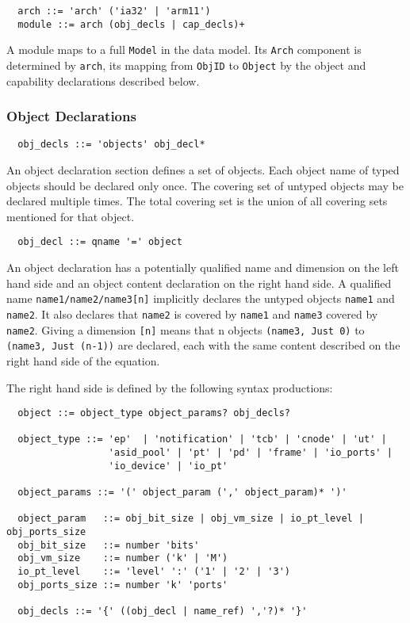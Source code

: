 \documentclass[a4paper,12pt]{article}
\begin{document}
\begin{verbatim}
  arch ::= 'arch' ('ia32' | 'arm11') 
  module ::= arch (obj_decls | cap_decls)+ 
\end{verbatim}

A module maps to a full \texttt{Model} in the data model. Its \texttt{Arch} component is determined by \texttt{arch}, its mapping from \texttt{ObjID} to \texttt{Object} by the object and capability declarations described below.


\subsubsection{Object Declarations}

\begin{verbatim}
  obj_decls ::= 'objects' obj_decl*
\end{verbatim}

An object declaration section defines a set of objects. Each object name of typed objects should be declared only once. The covering set of untyped objects may be declared multiple times. The total covering set is the union of all covering sets mentioned for that object.

\begin{verbatim}
  obj_decl ::= qname '=' object
\end{verbatim}

An object declaration has a potentially qualified name and dimension on the left hand side and an object content declaration on the right hand side. A qualified name \texttt{name1/name2/name3[n]} implicitly declares the untyped objects \texttt{name1} and \texttt{name2}. It also declares that \texttt{name2} is covered by \texttt{name1} and \texttt{name3} covered by \texttt{name2}. Giving a dimension \texttt{[n]} means that n objects \texttt{(name3, Just 0)} to \texttt{(name3, Just (n-1))} are declared, each with the same content described on the right hand side of the equation.

The right hand side is defined by the following syntax productions:

\begin{verbatim}
  object ::= object_type object_params? obj_decls?

  object_type ::= 'ep'  | 'notification' | 'tcb' | 'cnode' | 'ut' | 
                  'asid_pool' | 'pt' | 'pd' | 'frame' | 'io_ports' |
                  'io_device' | 'io_pt' 

  object_params ::= '(' object_param (',' object_param)* ')'

  object_param   ::= obj_bit_size | obj_vm_size | io_pt_level | obj_ports_size
  obj_bit_size   ::= number 'bits'
  obj_vm_size    ::= number ('k' | 'M')
  io_pt_level    ::= 'level' ':' ('1' | '2' | '3')
  obj_ports_size ::= number 'k' 'ports'

  obj_decls ::= '{' ((obj_decl | name_ref) ','?)* '}'
\end{verbatim}
\end{document}
